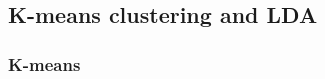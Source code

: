 \documentclass[11pt,a4paper]{article}
\begin{document}


\subsection{K-means clustering and LDA}

  \subsubsection{K-means}
% 
% 
% 


\end{document}
